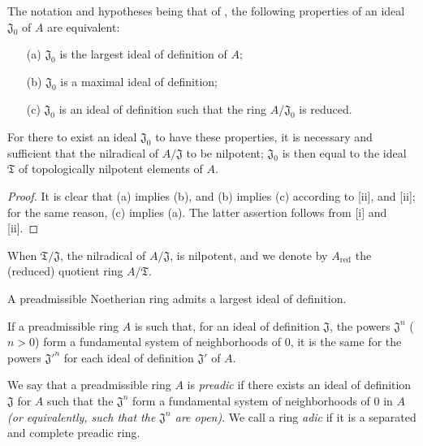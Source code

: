 \begin{corollary}[7.1.6]
\label{0.7.1.6}
The notation and hypotheses being that of , the following
properties of an ideal $\mathfrak{J}_0$ of $A$ are equivalent:
\begin{enumerate}
  \item[{\rm(a)}] $\mathfrak{J}_0$ is the largest ideal of definition of $A$;
  \item[{\rm(b)}] $\mathfrak{J}_0$ is a maximal ideal of definition;
  \item[{\rm(c)}] $\mathfrak{J}_0$ is an ideal of definition such that the ring $A/\mathfrak{J}_0$ is reduced.
\end{enumerate}
For there to exist an ideal $\mathfrak{J}_0$ to have these properties, it is
necessary and sufficient that the nilradical of $A/\mathfrak{J}$ to be
nilpotent; $\mathfrak{J}_0$ is then equal to the ideal $\mathfrak{T}$ of
topologically nilpotent elements of $A$.
\end{corollary}

\begin{proof}
It is clear that (a) implies (b), and (b) implies (c) according to
[ii], and [ii]; for the same
reason, (c) implies (a). The latter assertion follows from [i] and
[ii].
\end{proof}

When $\mathfrak{T}/\mathfrak{J}$, the nilradical of $A/\mathfrak{J}$, is
nilpotent, and we denote by $A_\text{red}$ the (reduced) quotient ring
$A/\mathfrak{T}$.

\begin{corollary}[7.1.7]
\label{0.7.1.7}
A preadmissible Noetherian ring admits a largest ideal of definition.
\end{corollary}

\begin{corollary}[7.1.8]
\label{0.7.1.8}
If a preadmissible ring $A$ is such that, for an ideal of definition
$\mathfrak{J}$, the powers $\mathfrak{J}^n$ ($n>0$) form a fundamental system
of neighborhoods of $0$, it is the same for the powers ${\mathfrak{J}'}^n$ for
each ideal of definition $\mathfrak{J}'$ of $A$.
\end{corollary}

\begin{definition}[7.1.9]
\label{0.7.1.9}
We say that a preadmissible ring $A$ is \emph{preadic} if there exists an
ideal of definition $\mathfrak{J}$ for $A$ such that the $\mathfrak{J}^n$ form
a fundamental system of neighborhoods of $0$ in $A$ \emph{(or equivalently, such
that the $\mathfrak{J}^n$ are \emph{open})}. We call a ring \emph{adic} if it
is a separated and complete preadic ring.
\end{definition}

